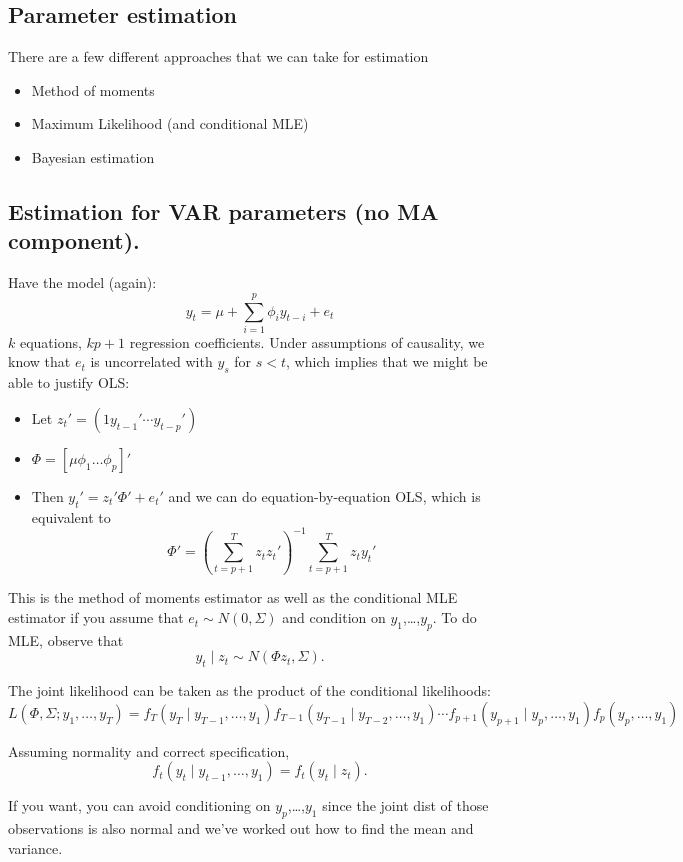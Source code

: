 \subsection{Parameter estimation}

There are a few different approaches that we can take for estimation
\begin{itemize}
\item Method of moments
\item Maximum Likelihood (and conditional MLE)
\item Bayesian estimation
\end{itemize}

\subsection{Estimation for VAR parameters (no MA component).}

Have the model (again):
\[y_t = \mu + \sum_{i=1}^p \phi_i y_{t-i} + e_t\] $k$ equations, $k p + 1$
regression coefficients. Under assumptions of causality, we know that
$e_t$ is uncorrelated with $y_s$ for $s < t$, which implies that we
might be able to justify OLS:
\begin{itemize}
\item Let $z_t' = (1 y_{t-1}' \cdots y_{t-p}')$
\item $\Phi = [ \mu \phi_1 \dots \phi_p ]'$
\item Then $y_t' = z_t'\Phi' + e_t'$ and we can do equation-by-equation
  OLS, which is equivalent to
  \[\hat \Phi' = (\sum_{t=p+1}^T z_t z_t')^{-1} \sum_{t=p+1}^T z_t y_t'\]
\end{itemize}

This is the method of moments estimator as well as the conditional MLE
estimator if you assume that $e_t ∼ N(0, \Sigma)$ and
condition on $y_1$,\dots,$y_p$. To do MLE, observe that
\[y_t ∣ z_t ∼ N(\Phi z_t, \Sigma).\]

The joint likelihood can be taken as the product of the conditional
likelihoods:
\[L(\Phi, \Sigma; y_1,\dots,y_T) = f_T(y_T ∣ y_{T-1},\dots, y_1) f_{T-1}(y_{T-1} ∣
y_{T-2},\dots, y_1) \cdots f_{p+1}(y_{p+1} ∣ y_p,\dots,y_1) f_p(y_p,\dots,y_1)\]

Assuming normality and correct specification,
\[f_t(y_t ∣ y_{t-1},\dots, y_1) = f_t(y_t ∣ z_t).\]

If you want, you can avoid conditioning on $y_p$,\dots,$y_1$ since the
joint dist of those observations is also normal and we've worked out
how to find the mean and variance.

